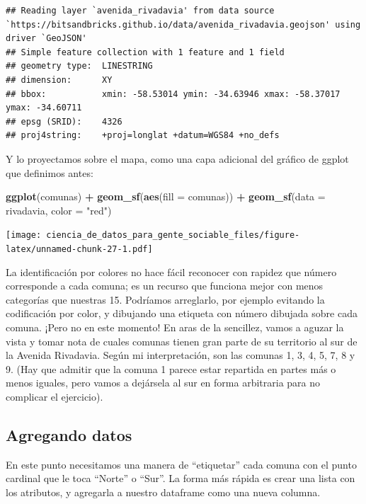 \documentclass[spanish,]{book}
\newenvironment{Shaded}{\begin{snugshade}}{\end{snugshade}}
\newcommand{\DataTypeTok}[1]{\textcolor[rgb]{0.13,0.29,0.53}{#1}}
\newcommand{\KeywordTok}[1]{\textcolor[rgb]{0.13,0.29,0.53}{\textbf{#1}}}
\newcommand{\NormalTok}[1]{#1}
\newcommand{\OperatorTok}[1]{\textcolor[rgb]{0.81,0.36,0.00}{\textbf{#1}}}
\newcommand{\StringTok}[1]{\textcolor[rgb]{0.31,0.60,0.02}{#1}}
\begin{document}
\begin{verbatim}
## Reading layer `avenida_rivadavia' from data source `https://bitsandbricks.github.io/data/avenida_rivadavia.geojson' using driver `GeoJSON'
## Simple feature collection with 1 feature and 1 field
## geometry type:  LINESTRING
## dimension:      XY
## bbox:           xmin: -58.53014 ymin: -34.63946 xmax: -58.37017 ymax: -34.60711
## epsg (SRID):    4326
## proj4string:    +proj=longlat +datum=WGS84 +no_defs
\end{verbatim}

Y lo proyectamos sobre el mapa, como una capa adicional del gráfico de ggplot que definimos antes:

\begin{Shaded}
\begin{Highlighting}[]
\KeywordTok{ggplot}\NormalTok{(comunas) }\OperatorTok{+}
\StringTok{    }\KeywordTok{geom_sf}\NormalTok{(}\KeywordTok{aes}\NormalTok{(}\DataTypeTok{fill =}\NormalTok{ comunas)) }\OperatorTok{+}
\StringTok{    }\KeywordTok{geom_sf}\NormalTok{(}\DataTypeTok{data =}\NormalTok{ rivadavia, }\DataTypeTok{color =} \StringTok{"red"}\NormalTok{)}
\end{Highlighting}
\end{Shaded}

\texttt{[image: ciencia\_de\_datos\_para\_gente\_sociable\_files/figure-latex/unnamed-chunk-27-1.pdf]}

La identificación por colores no hace fácil reconocer con rapidez que número corresponde a cada comuna; es un recurso que funciona mejor con menos categorías que nuestras 15. Podríamos arreglarlo, por ejemplo evitando la codificación por color, y dibujando una etiqueta con número dibujada sobre cada comuna. ¡Pero no en este momento! En aras de la sencillez, vamos a aguzar la vista y tomar nota de cuales comunas tienen gran parte de su territorio al sur de la Avenida Rivadavia. Según mi interpretación, son las comunas 1, 3, 4, 5, 7, 8 y 9. (Hay que admitir que la comuna 1 parece estar repartida en partes más o menos iguales, pero vamos a dejársela al sur en forma arbitraria para no complicar el ejercicio).

\hypertarget{agregando-datos}{%
\subsection{Agregando datos}\label{agregando-datos}}

En este punto necesitamos una manera de ``etiquetar'' cada comuna con el punto cardinal que le toca ``Norte'' o ``Sur''. La forma más rápida es crear una lista con los atributos, y agregarla a nuestro dataframe como una nueva columna.
\end{document}
